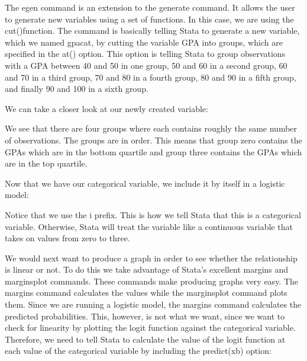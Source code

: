 \documentclass[a4paper,12pt,oneside]{book}
\begin{document}
\begin{stlog}\end{stlog}

The egen command is an extension to the generate command. It allows the user to generate new variables using a set of functions. In this case, we are using the cut()function. The command is basically telling 
Stata to generate a new variable, which we named gpacat, by cutting the variable GPA into groups, which are specified in the at() option. This option is telling Stata to group observations with a GPA between 40 
and 50 in one group, 50 and 60 in a second group, 60 and 70 in a third group, 70 and 80 in a fourth group, 80 and 90 in a fifth group, and finally 90 and 100 in a sixth group.

We can take a closer look at our newly created variable:

\begin{stlog}\end{stlog}

We see that there are four groups where each contains roughly the same number of observations. The groups are in order. This means that group zero contains the GPAs which are in the bottom quartile and group 
three contains the GPAs which are in the top quartile.

Now that we have our categorical variable, we include it by itself in a logistic model:

\begin{stlog}\end{stlog}

Notice that we use the i prefix. This is how we tell Stata that this is a categorical variable. Otherwise, Stata will treat the variable like a continuous variable that takes on values from zero to three. 

We would next want to produce a graph in order to see whether the relationship is linear or not. To do this we take advantage of Stata’s excellent margins and marginsplot commands. 
These commands make producing graphs very easy. The margins command calculates the values while the marginsplot command plots them. Since we are running a logistic model, the margins 
command calculates the predicted probabilities. This, however, is not what we want, since we want to check for linearity by plotting the logit function against the categorical variable. 
Therefore, we need to tell Stata to calculate the value of the logit function at each value of the categorical variable by including the predict(xb) option:
\end{document}
